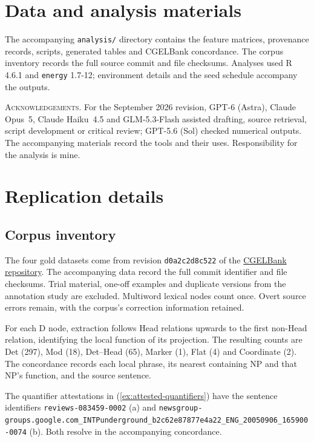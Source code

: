 \documentclass[12pt]{article}
\begin{document}
\section*{Data and analysis materials}

The accompanying \texttt{analysis/} directory contains the feature matrices, provenance records, scripts, generated tables and CGELBank concordance. The corpus inventory records the full source commit and file checksums. Analyses used R 4.6.1 and \texttt{energy} 1.7-12; environment details and the seed schedule accompany the outputs.

\vspace{0.5\baselineskip}
\noindent\textsc{Acknowledgements.} For the September 2026 revision, GPT-6 (Astra), Claude Opus~5, Claude Haiku~4.5 and GLM-5.3-Flash assisted drafting, source retrieval, script development or critical review; GPT-5.6 (Sol) checked numerical outputs. The accompanying materials record the tools and their uses. Responsibility for the analysis is mine.

\appendix
\section{Replication details}\label{app:replication}

\subsection{Corpus inventory}\label{app:corpus}

The four gold datasets come from revision \texttt{d0a2c2d8c522} of the \href{https://github.com/nert-nlp/cgel}{CGELBank repository}. The accompanying data record the full commit identifier and file checksums. Trial material, one-off examples and duplicate versions from the annotation study are excluded. Multiword lexical nodes count once. Overt source errors remain, with the corpus's correction information retained.

For each D node, extraction follows Head relations upwards to the first non-Head relation, identifying the local function of its projection. The resulting counts are Det (297), Mod (18), Det--Head (65), Marker (1), Flat (4) and Coordinate (2). The concordance records each local phrase, its nearest containing NP and that NP's function, and the source sentence.

The quantifier attestations in (\ref{ex:attested-quantifiers}) have the sentence identifiers \nolinkurl{reviews-083459-0002} (a) and \nolinkurl{newsgroup-groups.google.com_INTPunderground_b2c62e87877e4a22_ENG_20050906_165900-0074} (b). Both resolve in the accompanying concordance.
\end{document}

